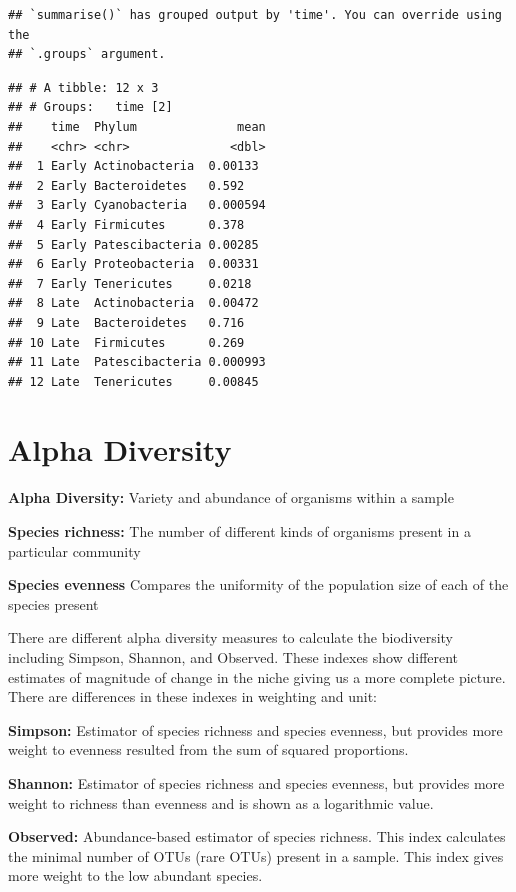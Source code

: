 \documentclass[
]{book}
\begin{document}
\begin{verbatim}
## `summarise()` has grouped output by 'time'. You can override using the
## `.groups` argument.
\end{verbatim}

\begin{verbatim}
## # A tibble: 12 x 3
## # Groups:   time [2]
##    time  Phylum              mean
##    <chr> <chr>              <dbl>
##  1 Early Actinobacteria  0.00133 
##  2 Early Bacteroidetes   0.592   
##  3 Early Cyanobacteria   0.000594
##  4 Early Firmicutes      0.378   
##  5 Early Patescibacteria 0.00285 
##  6 Early Proteobacteria  0.00331 
##  7 Early Tenericutes     0.0218  
##  8 Late  Actinobacteria  0.00472 
##  9 Late  Bacteroidetes   0.716   
## 10 Late  Firmicutes      0.269   
## 11 Late  Patescibacteria 0.000993
## 12 Late  Tenericutes     0.00845
\end{verbatim}

\hypertarget{alpha-diversity}{%
\section{Alpha Diversity}\label{alpha-diversity}}

\textbf{Alpha Diversity:} Variety and abundance of organisms within a sample

\textbf{Species richness:} The number of different kinds of organisms present in a particular community

\textbf{Species evenness} Compares the uniformity of the population size of each of the species present

There are different alpha diversity measures to calculate the biodiversity including Simpson, Shannon, and Observed. These indexes show different estimates of magnitude of change in the niche giving us a more complete picture. There are differences in these indexes in weighting and unit:

\textbf{Simpson:} Estimator of species richness and species evenness, but provides more weight to evenness resulted from the sum of squared proportions.

\textbf{Shannon:} Estimator of species richness and species evenness, but provides more weight to richness than evenness and is shown as a logarithmic value.

\textbf{Observed:} Abundance-based estimator of species richness. This index calculates the minimal number of OTUs (rare OTUs) present in a sample. This index gives more weight to the low abundant species.
\end{document}
